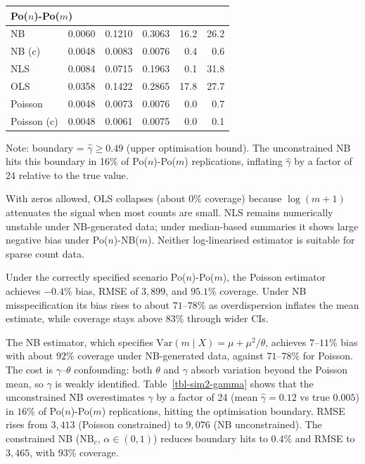 \begin{table}[ht!]
\begin{tabular*}{\linewidth}{@{\extracolsep{\fill}}lrrrrr}
\multicolumn{6}{l}{Po($n$)-Po($m$)} \\[2.5pt] 
\midrule\addlinespace[2.5pt]
NB & 0.0060 & 0.1210 & 0.3063 & 16.2 & 26.2 \\ 
NB (c) & 0.0048 & 0.0083 & 0.0076 & 0.4 & 0.6 \\ 
NLS & 0.0084 & 0.0715 & 0.1963 & 0.1 & 31.8 \\ 
OLS & 0.0358 & 0.1422 & 0.2865 & 17.8 & 27.7 \\ 
Poisson & 0.0048 & 0.0073 & 0.0076 & 0.0 & 0.7 \\ 
Poisson (c) & 0.0048 & 0.0061 & 0.0075 & 0.0 & 0.1 \\ 
\bottomrule
\end{tabular*}
\begin{minipage}{\linewidth}
\vspace{.05em}
Note: boundary = $\hat\gamma \geq 0.49$ (upper optimisation bound). The unconstrained NB hits this boundary in 16\% of Po($n$)-Po($m$) replications, inflating $\hat\gamma$ by a factor of 24 relative to the true value.\\
\end{minipage}
\end{table}



With zeros allowed, OLS collapses (about $0\%$ coverage) because
$\log(m+1)$ attenuates the signal when most counts are small. NLS remains
numerically unstable under NB-generated data; under median-based
summaries it shows large negative bias under Po($n$)-NB($m$). Neither
log-linearised estimator is suitable for sparse count data.

Under the correctly specified scenario Po($n$)-Po($m$), the Poisson estimator
achieves $-0.4\%$ bias, RMSE of $3{,}899$, and $95.1\%$ coverage. Under
NB misspecification its bias rises to about $71$--$78\%$ as overdispersion
inflates the mean estimate, while coverage stays above $83\%$ through
wider CIs.

The NB estimator, which specifies $\text{Var}(m \mid X) = \mu +
\mu^2/\theta$, achieves $7$--$11\%$ bias with about $92\%$ coverage under
NB-generated data, against $71$--$78\%$ for Poisson. The cost is
$\gamma$--$\theta$ confounding: both $\theta$ and $\gamma$ absorb
variation beyond the Poisson mean, so $\gamma$ is weakly identified.
Table~\ref{tbl-sim2-gamma} shows that the unconstrained NB overestimates
$\gamma$ by a factor of 24 (mean $\hat\gamma = 0.12$ vs true $0.005$) in
$16\%$ of Po($n$)-Po($m$) replications, hitting the optimisation boundary.
RMSE rises from $3{,}413$ (Poisson constrained) to $9{,}076$ (NB
unconstrained). The constrained NB (NB$_c$, $\alpha \in (0,1)$) reduces
boundary hits to $0.4\%$ and RMSE to $3{,}465$, with $93\%$ coverage.

